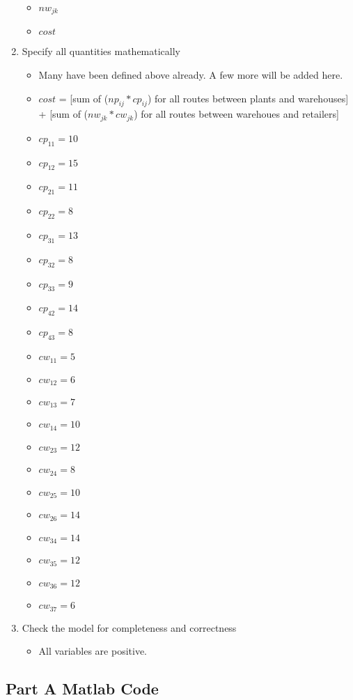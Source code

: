 \documentclass[../report/main.tex]{subfiles}
\begin{document}
\begin{enumerate}[1.]
\begin{itemize}
		\item $nw_{jk}$
		\item $cost$
	\end{itemize}
	\item Specify all quantities mathematically
	\begin{itemize}
		\item Many have been defined above already.  A few more will be added here.
		\item $cost$ = [sum of ($np_{ij}*cp_{ij}$) for all routes between plants and warehouses]
			+ [sum of ($nw_{jk}*cw_{jk}$) for all routes between warehoues and retailers]
		\item $cp_{11} = 10$
		\item $cp_{12} = 15$
		\item $cp_{21} = 11$
		\item $cp_{22} = 8$
		\item $cp_{31} = 13$
		\item $cp_{32} = 8$
		\item $cp_{33} = 9$
		\item $cp_{42} = 14$
		\item $cp_{43} = 8$
		\item $cw_{11} = 5$
		\item $cw_{12} = 6$
		\item $cw_{13} = 7$
		\item $cw_{14} = 10$
		\item $cw_{23} = 12$
		\item $cw_{24} = 8$
		\item $cw_{25} = 10$
		\item $cw_{26} = 14$
		\item $cw_{34} = 14$
		\item $cw_{35} = 12$
		\item $cw_{36} = 12$
		\item $cw_{37} = 6$
	\end{itemize}
	\item Check the model for completeness and correctness
	\begin{itemize}
	\item All variables are positive.
	\end{itemize}
\end{enumerate}
\subsection*{Part A Matlab Code}

\end{document}
